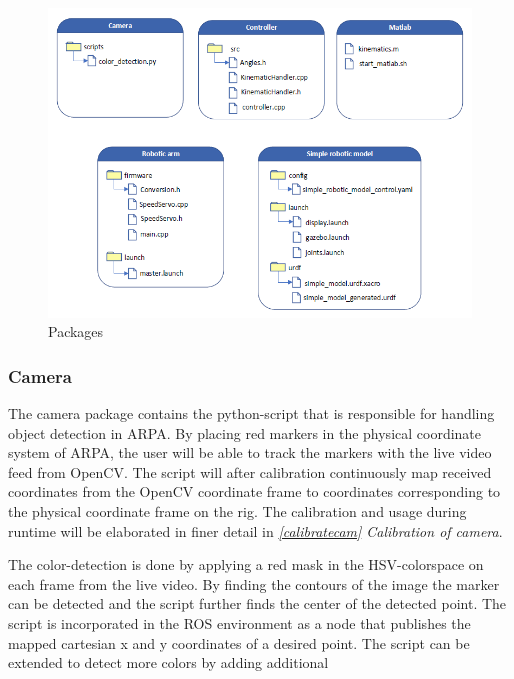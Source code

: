 \documentclass[11pt,a4paper, titlepage]{article}
\begin{document}
	\begin{figure}[H]
		\includegraphics[width=\linewidth]{../Diagrams/Packages.png}
		\caption{Packages}
		\label{fig:dir-list}
	\end{figure}
	
	
\subsubsection{Camera}
The camera package contains the python-script that is responsible for handling object detection in ARPA. By placing red markers in the physical coordinate system of ARPA, the user will be able to track the markers with the live video feed from OpenCV. The script will after calibration continuously map received coordinates from the OpenCV coordinate frame to coordinates corresponding to the physical coordinate frame on the rig. The calibration and usage during runtime will be elaborated in finer detail in \textit{\ref{calibratecam} Calibration of camera}.

The color-detection is done by applying a red mask in the HSV-colorspace on each frame from the live video. By finding the contours of the image the marker can be detected and the script further finds the center of the detected point. The script is incorporated in the ROS environment as a node that publishes the mapped cartesian x and y coordinates of a desired point. The script can be extended to detect more colors by adding additional
\end{document}
